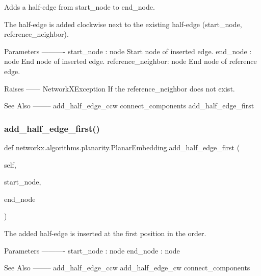 \begin{DoxyVerb}Adds a half-edge from start_node to end_node.

The half-edge is added clockwise next to the existing half-edge
(start_node, reference_neighbor).

Parameters
----------
start_node : node
    Start node of inserted edge.
end_node : node
    End node of inserted edge.
reference_neighbor: node
    End node of reference edge.

Raises
------
NetworkXException
    If the reference_neighbor does not exist.

See Also
--------
add_half_edge_ccw
connect_components
add_half_edge_first
\end{DoxyVerb}
 \mbox{\label{classnetworkx_1_1algorithms_1_1planarity_1_1PlanarEmbedding_a05923dc85b14af72865ae50d366fc95d}} 
\subsubsection{\texorpdfstring{add\+\_\+half\+\_\+edge\+\_\+first()}{add\_half\_edge\_first()}}
{\footnotesize\ttfamily def networkx.\+algorithms.\+planarity.\+Planar\+Embedding.\+add\+\_\+half\+\_\+edge\+\_\+first (\begin{DoxyParamCaption}\item[{}]{self,  }\item[{}]{start\+\_\+node,  }\item[{}]{end\+\_\+node }\end{DoxyParamCaption})}

\begin{DoxyVerb}The added half-edge is inserted at the first position in the order.

Parameters
----------
start_node : node
end_node : node

See Also
--------
add_half_edge_ccw
add_half_edge_cw
connect_components
\end{DoxyVerb}
 \mbox{\label{classnetworkx_1_1algorithms_1_1planarity_1_1PlanarEmbedding_a05c1cfdd3a6c1ea0720a12bdae0681a7}} 

